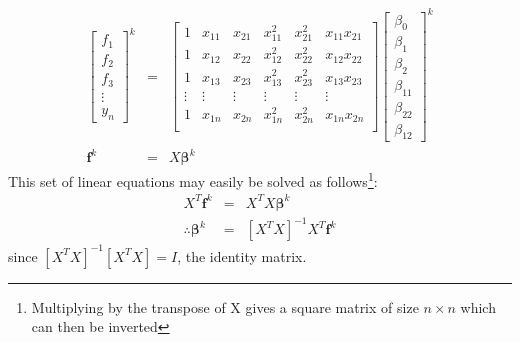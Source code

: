 \begin{eqnarray}
\begin{bmatrix}
f_1 \\ f_2 \\ f_3 \\ \vdots \\ y_n
\end{bmatrix}^k
&=& \begin{bmatrix}
1 & x_{11} & x_{21} & x_{11}^2 & x_{21}^2 & x_{11} x_{21} \\
1 & x_{12} & x_{22} & x_{12}^2 & x_{22}^2 & x_{12} x_{22} \\
1 & x_{13} & x_{23} & x_{13}^2 & x_{23}^2 & x_{13} x_{23} \\
\vdots & \vdots & \vdots & \vdots & \vdots & \vdots \\
1 & x_{1n} & x_{2n} & x_{1n}^2 & x_{2n}^2 & x_{1n} x_{2n} \\
\end{bmatrix}
\begin{bmatrix}
\beta_0 \\ \beta_1 \\ \beta_2 \\ \beta_{11} \\ \beta_{22} \\ \beta_{12}
\end{bmatrix}^k \\
\mathbf{f}^k &=& X \boldsymbol{\beta}^k
\end{eqnarray}
This set of linear equations may easily be solved as follows\footnote{Multiplying by the transpose of X gives a square matrix of size $n \times n$ which can then be inverted}: 
\begin{eqnarray}
X^T\mathbf{f}^k &=& X^TX\boldsymbol{\beta}^k  \nonumber \\
\therefore \boldsymbol{\beta}^k &=& [X^TX]^{-1}X^T\mathbf{f}^k
\end{eqnarray}
since $[X^TX]^{-1}[X^TX] = I$, the identity matrix.


